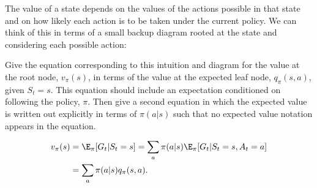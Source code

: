 
\begin{exercise}[Exercise 3.18]

The value of a state depends on the values of the actions possible in that state
and on how likely each action is to be taken under the current policy. We can think
of this in terms of a small backup diagram rooted at the state and considering each
possible action:


Give the equation corresponding to this intuition and diagram for the value at the
root node, $v_\pi(s)$, in terms of the value at the expected leaf node, $q_\pi(s,a)$,
given $S_t = s$. This equation should include an expectation conditioned on following
the policy, $\pi$. Then give a second equation in which the expected value is written
out explicitly in terms of $\pi(a|s)$ such that no expected value notation appears in the equation.

\end{exercise}


\begin{solution}

\begin{align*}
  v_\pi(s) &= \E_\pi[G_t | S_t = s] = \sum_a \pi(a|s) \E_\pi[G_t | S_t = s, A_t = a] \\
  &= \sum_a \pi(a|s)q_\pi(s,a).
\end{align*}

\end{solution}

